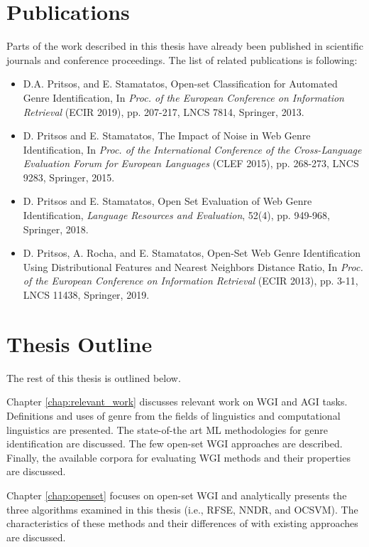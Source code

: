 \section{Publications}

Parts of the work described in this thesis have already been published in scientific journals and conference proceedings. The list of related publications is following:

\begin{itemize}
\item D.A. Pritsos, and E. Stamatatos, Open-set Classification for Automated Genre Identification, In \textit{Proc. of the European Conference on Information Retrieval} (ECIR 2019), pp. 207-217, LNCS 7814, Springer, 2013.
\item D. Pritsos and E. Stamatatos, The Impact of Noise in Web Genre Identification, In \textit{Proc. of the International Conference of the Cross-Language Evaluation Forum for European Languages} (CLEF 2015), pp. 268-273, LNCS  9283, Springer, 2015.
\item D. Pritsos and E. Stamatatos, Open Set Evaluation of Web Genre Identification, \textit{Language Resources and Evaluation}, 52(4), pp. 949-968, Springer, 2018.
\item D. Pritsos, A. Rocha, and E. Stamatatos, Open-Set Web Genre Identification Using Distributional Features and Nearest Neighbors Distance Ratio, In \textit{Proc. of the European Conference on Information Retrieval} (ECIR 2013), pp. 3-11, LNCS 11438, Springer, 2019.
\end{itemize}

\section{Thesis Outline} \label{chap:Introduction:sec:thesis_outline}

The rest of this thesis is outlined below. 

Chapter \ref{chap:relevant_work} discusses relevant work on WGI and AGI tasks. Definitions and uses of genre from the fields of linguistics and computational linguistics are presented. The state-of-the art ML methodologies for genre identification are discussed. The few open-set WGI approaches are described. Finally, the available corpora for evaluating WGI methods and their properties are discussed.

Chapter \ref{chap:openset} focuses on open-set WGI and analytically presents the three algorithms examined in this thesis (i.e., RFSE, NNDR, and OCSVM). The characteristics of these methods and their differences of with existing approaches are discussed.

